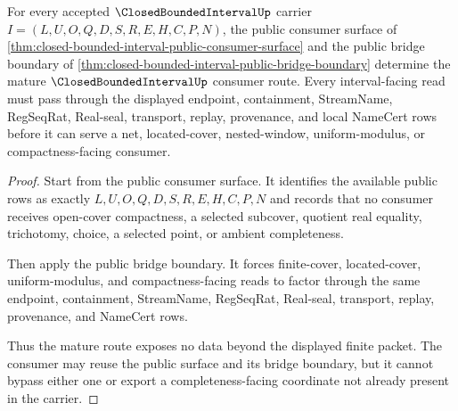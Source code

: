 \begin{theorem}
\label{thm:closed-bounded-interval-mature-consumer-surface}
For every accepted $\ClosedBoundedIntervalUp$ carrier $I=(L,U,O,Q,D,S,R,E,H,C,P,N)$, the public consumer surface of \autoref{thm:closed-bounded-interval-public-consumer-surface} and the public bridge boundary of \autoref{thm:closed-bounded-interval-public-bridge-boundary} determine the mature $\ClosedBoundedIntervalUp$ consumer route. Every interval-facing read must pass through the displayed endpoint, containment, StreamName, RegSeqRat, Real-seal, transport, replay, provenance, and local NameCert rows before it can serve a net, located-cover, nested-window, uniform-modulus, or compactness-facing consumer.
\end{theorem}
\begin{proof}
Start from the public consumer surface. It identifies the available public rows as exactly $L,U,O,Q,D,S,R,E,H,C,P,N$ and records that no consumer receives open-cover compactness, a selected subcover, quotient real equality, trichotomy, choice, a selected point, or ambient completeness.

Then apply the public bridge boundary. It forces finite-cover, located-cover, uniform-modulus, and compactness-facing reads to factor through the same endpoint, containment, StreamName, RegSeqRat, Real-seal, transport, replay, provenance, and NameCert rows.

Thus the mature route exposes no data beyond the displayed finite packet. The consumer may reuse the public surface and its bridge boundary, but it cannot bypass either one or export a completeness-facing coordinate not already present in the carrier.
\end{proof}
